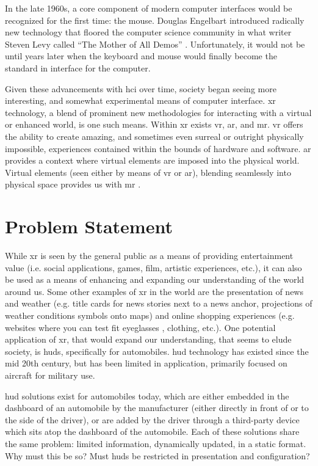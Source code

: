 \par In the late 1960s, a core component of modern computer interfaces would be recognized for the first time: the mouse. Douglas Engelbart introduced radically new technology that floored the computer science community in what writer Steven Levy called ``The Mother of All Demos'' \cite{Levy1994}. Unfortunately, it would not be until years later when the keyboard and mouse would finally become the standard in interface for the computer.

\par Given these advancements with \gls{hci} over time, society began seeing more interesting, and somewhat experimental means of computer interface. \gls{xr} technology, a blend of prominent new methodologies for interacting with a virtual or enhanced world, is one such means. Within \gls{xr} exists \gls{vr}, \gls{ar}, and \gls{mr}. \gls{vr} offers the ability to create amazing, and sometimes even surreal or outright physically impossible, experiences contained within the bounds of hardware and software. \gls{ar} provides a context where virtual elements are imposed into the physical world. Virtual elements (seen either by means of \gls{vr} or \gls{ar}), blending seamlessly into physical space provides us with \gls{mr} \cite{Vasarainen2021}.

\section{Problem Statement}
    \par While \gls{xr} is seen by the general public as a means of providing entertainment value (i.e. social applications, games, film, artistic experiences, etc.), it can also be used as a means of enhancing and expanding our understanding of the world around us. Some other examples of \gls{xr} in the world are the presentation of news and weather (e.g. title cards for news stories next to a news anchor, projections of weather conditions symbols onto maps) and online shopping experiences (e.g. websites where you can test fit eyeglasses \cite{Zhang2017}, clothing, etc.). One potential application of \gls{xr}, that would expand our understanding, that seems to elude society, is \glspl{hud}, specifically for automobiles. \gls{hud} technology has existed since the mid 20th century, but has been limited in application, primarily focused on aircraft for military use.

    \par \gls{hud} solutions exist for automobiles today, which are either embedded in the dashboard of an automobile by the manufacturer (either directly in front of or to the side of the driver), or are added by the driver through a third-party device which sits atop the dashboard of the automobile. Each of these solutions share the same problem: limited information, dynamically updated, in a static format. Why must this be so? Must \glspl{hud} be restricted in presentation and configuration?

